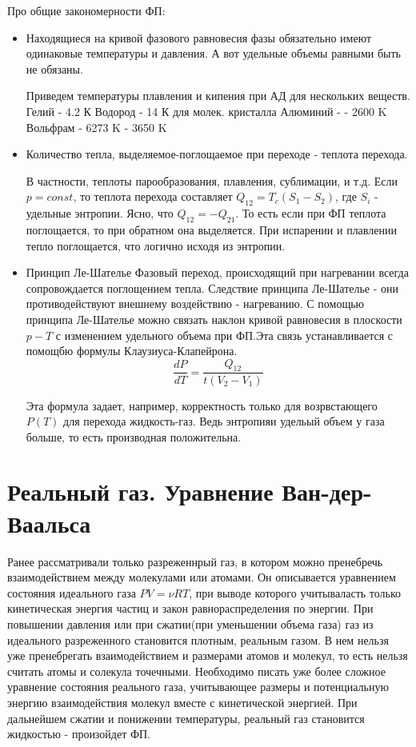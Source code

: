 \documentclass{article}
\begin{document}
Про общие закономерности ФП:
\begin{itemize}
\item Находящиеся на кривой фазового равновесия фазы обязательно имеют одинаковые температуры и давления. А вот удельные объемы равными быть не обязаны.

Приведем температуры плавления и кипения при АД для нескольких веществ.
Гелий - 4.2 К
Водород - 14 К для молек. кристалла
Алюминий -  - 2600 K
Вольфрам - 6273 K - 3650 K
\item Количество тепла, выделяемое-поглощаемое при переходе - теплота перехода. 

В частности, теплоты парообразования, плавления, сублимации, и т.д. Если $p=const$, то теплота перехода составляет $Q_{12} = T_{c}(S_1-S_2)$, где $S_i$ - удельные энтропии. Ясно, что $Q_{12} = - Q_{21}$. То есть если при ФП теплота поглощается, то при обратном она выделяется. При испарении и плавлении тепло поглощается, что логично исходя из энтропии. 

\item Принцип Ле-Шателье
Фазовый переход, происходящий при нагревании всегда сопровождается поглощением тепла. Следствие принципа Ле-Шателье - они противодействуют внешнему воздействию - нагреванию. С помощью принципа Ле-Шателье можно связать наклон кривой равновесия в плоскости $p-T$ с изменением удельного объема при ФП.Эта связь устанавливается с помощбю формулы Клаузиуса-Клапейрона.
$$\frac{dP}{dT} = \frac{Q_{12}}{t\left(V_2-V_1\right)}$$

Эта формула задает, например, корректность только для возрвстающего $P(T)$ для перехода жидкость-газ. Ведь энтропияи удельый объем у газа больше, то есть производная положительна.
\end{itemize}

\section{Реальный газ. Уравнение Ван-дер-Ваальса}

Ранее рассматривали только разреженнрый газ, в котором можно пренебречь взаимодействием между молекулами или атомами. Он описывается уравнением состояния идеального газа $PV = \nu RT$, при выводе которого учитываласть только кинетическая энергия частиц и закон равнораспределения по энергии. При повышении давления или при сжатии(при уменьшении объема газа) газ из идеального разреженного становится плотным, реальным газом. В нем нельзя уже пренебрегать взаимодействием и размерами атомов и молекул,  то есть нельзя считать атомы и солекула точечными. Необходимо писать уже более сложное уравнение состояния реального газа, учитывающее размеры и потенциальную энергию взаимодействия молекул вместе с кинетической энергией. При дальнейшем сжатии и понижении температуры, реальный газ становится жидкостью - произойдет ФП.
\end{document}
